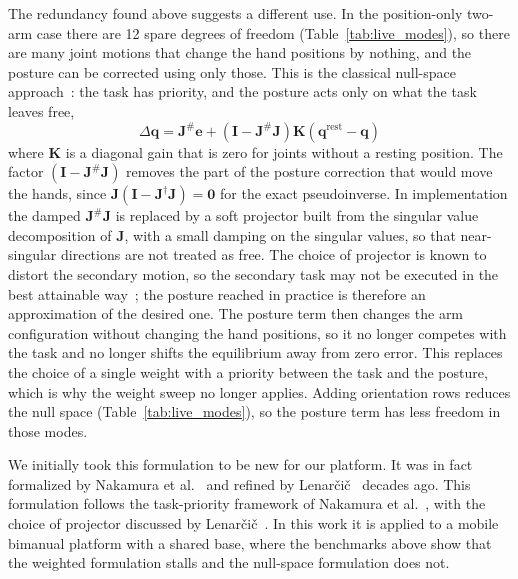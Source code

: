 \documentclass[12pt,a4paper]{article}
\begin{document}
The redundancy found above suggests a different use. In the position-only two-arm case there are 12 spare degrees of freedom (Table~\ref{tab:live_modes}), so there are many joint motions that change the hand positions by nothing, and the posture can be corrected using only those. This is the classical null-space approach~\cite{nakamura1987,schinstock1994}: the task has priority, and the posture acts only on what the task leaves free,
\begin{equation}
    \Delta\mathbf{q}
    = \mathbf{J}^{\#}\mathbf{e}
    + \left(\mathbf{I}-\mathbf{J}^{\#}\mathbf{J}\right)\mathbf{K}\left(\mathbf{q}^{\mathrm{rest}}-\mathbf{q}\right)
    \label{eq:stacked_nullspace}
\end{equation}
where $\mathbf{K}$ is a diagonal gain that is zero for joints without a resting position. The factor $(\mathbf{I}-\mathbf{J}^{\#}\mathbf{J})$ removes the part of the posture correction that would move the hands, since $\mathbf{J}(\mathbf{I}-\mathbf{J}^{\dagger}\mathbf{J})=\mathbf{0}$ for the exact pseudoinverse. In implementation the damped $\mathbf{J}^{\#}\mathbf{J}$ is replaced by a soft projector built from the singular value decomposition of $\mathbf{J}$, with a small damping on the singular values, so that near-singular directions are not treated as free. The choice of projector is known to distort the secondary motion, so the secondary task may not be executed in the best attainable way~\cite{lenarcic1998}; the posture reached in practice is therefore an approximation of the desired one. The posture term then changes the arm configuration without changing the hand positions, so it no longer competes with the task and no longer shifts the equilibrium away from zero error. This replaces the choice of a single weight with a priority between the task and the posture, which is why the weight sweep no longer applies. Adding orientation rows reduces the null space (Table~\ref{tab:live_modes}), so the posture term has less freedom in those modes.

We initially took this formulation to be new for our platform. It was in fact formalized by Nakamura et al.~\cite{nakamura1987} and refined by Lenar\v{c}i\v{c}~\cite{lenarcic1998} decades ago. This formulation follows the task-priority framework of Nakamura et al.~\cite{nakamura1987}, with the choice of projector discussed by Lenar\v{c}i\v{c}~\cite{lenarcic1998}. In this work it is applied to a mobile bimanual platform with a shared base, where the benchmarks above show that the weighted formulation stalls and the null-space formulation does not.
\end{document}
